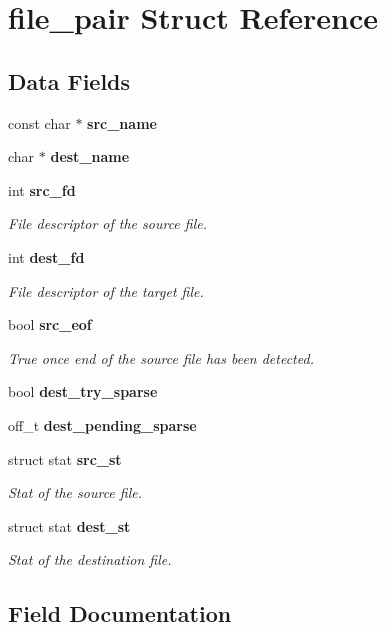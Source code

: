 \section{file\+\_\+pair Struct Reference}
\label{structfile__pair}
\subsection*{Data Fields}
\begin{DoxyCompactItemize}
\item 
const char $\ast$ \textbf{ src\+\_\+name}
\item 
char $\ast$ \textbf{ dest\+\_\+name}
\item 
int \textbf{ src\+\_\+fd}
\begin{DoxyCompactList}\small\item\em File descriptor of the source file. \end{DoxyCompactList}\item 
int \textbf{ dest\+\_\+fd}
\begin{DoxyCompactList}\small\item\em File descriptor of the target file. \end{DoxyCompactList}\item 
bool \textbf{ src\+\_\+eof}
\begin{DoxyCompactList}\small\item\em True once end of the source file has been detected. \end{DoxyCompactList}\item 
bool \textbf{ dest\+\_\+try\+\_\+sparse}
\item 
off\+\_\+t \textbf{ dest\+\_\+pending\+\_\+sparse}
\item 
struct stat \textbf{ src\+\_\+st}
\begin{DoxyCompactList}\small\item\em Stat of the source file. \end{DoxyCompactList}\item 
struct stat \textbf{ dest\+\_\+st}
\begin{DoxyCompactList}\small\item\em Stat of the destination file. \end{DoxyCompactList}\end{DoxyCompactItemize}


\subsection{Field Documentation}
\mbox{\label{structfile__pair_abcd6b5b852a5bc8815a44dd025113bcf}} 

